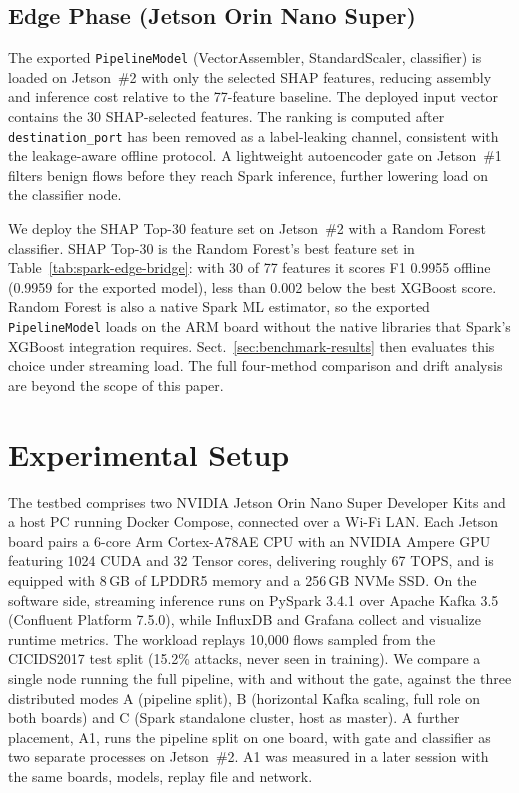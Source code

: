 \documentclass[runningheads]{llncs}
\begin{document}
\subsection{Edge Phase (Jetson Orin Nano Super)}
\label{sec:edge-phase}

The exported \texttt{PipelineModel} (VectorAssembler, StandardScaler, classifier) is loaded on Jetson~\#2 with only the selected SHAP features, reducing assembly and inference cost relative to the 77-feature baseline. The deployed input vector contains the 30 SHAP-selected features. The ranking is computed after \texttt{destination\_port} has been removed as a label-leaking channel, consistent with the leakage-aware offline protocol. A lightweight autoencoder gate on Jetson~\#1 filters benign flows before they reach Spark inference, further lowering load on the classifier node.

We deploy the SHAP Top-30 feature set on Jetson~\#2 with a Random Forest classifier. SHAP Top-30 is the Random Forest's best feature set in Table~\ref{tab:spark-edge-bridge}: with 30 of 77 features it scores F1 0.9955 offline (0.9959 for the exported model), less than 0.002 below the best XGBoost score. Random Forest is also a native Spark ML estimator, so the exported \texttt{PipelineModel} loads on the ARM board without the native libraries that Spark's XGBoost integration requires. Sect.~\ref{sec:benchmark-results} then evaluates this choice under streaming load. The full four-method comparison and drift analysis are beyond the scope of this paper.

\section{Experimental Setup}

The testbed comprises two NVIDIA Jetson Orin Nano Super Developer Kits and a host PC running Docker Compose, connected over a Wi-Fi LAN. Each Jetson board pairs a 6-core Arm Cortex-A78AE CPU with an NVIDIA Ampere GPU featuring 1024 CUDA and 32 Tensor cores, delivering roughly 67 TOPS, and is equipped with 8\,GB of LPDDR5 memory and a 256\,GB NVMe SSD. On the software side, streaming inference runs on PySpark 3.4.1 over Apache Kafka 3.5 (Confluent Platform 7.5.0), while InfluxDB and Grafana collect and visualize runtime metrics. The workload replays 10{,}000 flows sampled from the CICIDS2017 test split (15.2\% attacks, never seen in training). We compare a single node running the full pipeline, with and without the gate, against the three distributed modes A (pipeline split), B (horizontal Kafka scaling, full role on both boards) and C (Spark standalone cluster, host as master). A further placement, A1, runs the pipeline split on one board, with gate and classifier as two separate processes on Jetson~\#2. A1 was measured in a later session with the same boards, models, replay file and network.
\end{document}
